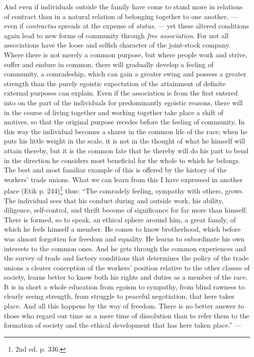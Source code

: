 \documentclass[12pt,a4paper,openany]{book}
\newcommand{\opage}[1]{\marginnote{\footnotesize\textit{[#1]}}}
\begin{document}
And even if individuals outside the family have come
to stand more in relations of contract than in a natural
relation of belonging together to one another, --- even if \emph{contractus} spreads at the
expense of \emph{status}, --- yet these altered
conditions again lead to new forms of community through \emph{free
association}. For not all associations have the loose
and selfish character of the joint-stock company. Where there is not merely a common
purpose, but where people work and strive, suffer and endure in
common, there will gradually develop a
feeling of community, a comradeship, which can gain a greater swing and
possess a greater strength than the purely egoistic
expectation of the attainment of definite external purposes can explain.
Even if the association is from the first entered into on the part of
the individuals for predominantly egoistic reasons, there will in the course of
living together and working together take place a shift of
motives, so that the original purpose
\opage{155}recedes before the feeling of community. In this way the
individual becomes a sharer in the common life of the race; when he puts
his little weight in the scale, it is not in the thought of what he
himself will attain thereby, but it is the common fate
that he thereby will do his part to bend in the direction he
considers most beneficial for the whole to which he belongs.
The best and most familiar example of this is offered by
the history of the workers' trade unions. What we can learn from
this I have expressed in another place (Etik p. 244)\footnote{2nd ed. p. 336.} thus:
``The comradely feeling, sympathy with others, grows. The
individual sees that his conduct during and outside work, his
ability, diligence, self-control, and thrift become
of significance for far more than himself. There is formed, so to
speak, an ethical sphere around him, a great family, of which
he feels himself a member. He comes to know brotherhood,
which before was almost forgotten for freedom and equality. He learns to
subordinate his own interests to the common ones. And he gets
through the common experiences and the survey of trade
and factory conditions that determines the policy of the trade unions
a clearer conception of the workers' position relative to the other
classes of society, learns better to know both his rights and duties as
a member of the race. It is in short a whole
education from egoism to sympathy, from blind rawness to clearly
seeing strength, from struggle to peaceful negotiation, that here
takes place. And all this happens by the way of freedom. There is
no better answer to those who regard our time as a mere
time of dissolution than to refer them to the formation of society
and the ethical development that has here taken place.'' ---
\end{document}
